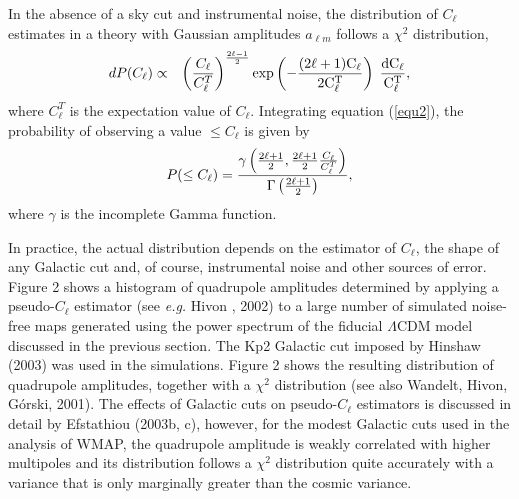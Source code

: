 In the absence of a sky cut and instrumental noise, the distribution
of $C_\ell$ estimates in a theory with Gaussian amplitudes $a_{\ell
m}$ follows a $\chi^2$ distribution,
\begin{eqnarray}
dP(C_\ell) &  \propto&   
\left ( { C_\ell \over C^T_\ell} \right)
^{{2 \ell - 1 \over  2}} \rm {exp} \left ( - {(2 \ell + 1) C_\ell
\over 2 C^T_\ell } \right )  \; {dC_\ell \over C^T_\ell},  \label{equ2} 
\end{eqnarray}
where $C_\ell^T$ is the expectation value of $C_\ell$.  Integrating equation 
(\ref{equ2}), the probability of observing 
a value $\le C_\ell$ is given by 
\begin{equation}
P(\le C_\ell) = {\gamma \left ( {2 \ell + 1 \over 2}, {2 \ell+1 \over 2} {C_\ell \over
C^T_\ell} \right )  \over \Gamma \left ( {2 \ell + 1 \over 2} \right )}, \label{equ3}
\end{equation}
where $\gamma$ is the incomplete Gamma function.


In practice, the actual distribution depends on the estimator of
$C_\ell$, the shape of any Galactic cut and, of course, instrumental
noise and other sources of error. Figure 2 shows a histogram of
quadrupole amplitudes determined by applying a pseudo-$C_\ell$
estimator (see {\it e.g.} Hivon \etal, 2002) to a large number of
simulated noise-free maps generated using the power spectrum of the
fiducial $\Lambda$CDM model discussed in the previous section.  The
Kp2 Galactic cut imposed by Hinshaw \etals (2003) was used in the
simulations. Figure 2 shows the resulting distribution of quadrupole
amplitudes, together with a $\chi^2$ distribution (see also
Wandelt,  Hivon, G\'orski,  2001).  The effects of
Galactic cuts on pseudo-$C_\ell$ estimators is discussed in detail by
Efstathiou (2003b, c), however, for the modest Galactic cuts used in the
analysis of WMAP, the quadrupole amplitude is weakly correlated with
higher multipoles and its distribution follows a $\chi^2$ distribution
quite accurately with a variance that is only marginally greater than
the cosmic variance.

